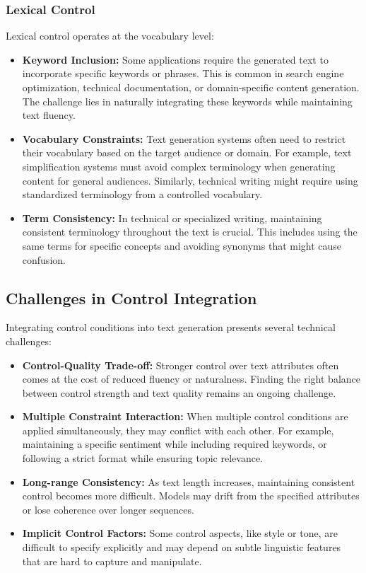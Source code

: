 \subsubsection{Lexical Control}

Lexical control operates at the vocabulary level:

\begin{itemize}
   \item \textbf{Keyword Inclusion:} Some applications require the generated text to incorporate specific keywords or phrases. This is common in search engine optimization, technical documentation, or domain-specific content generation. The challenge lies in naturally integrating these keywords while maintaining text fluency.
   
   \item \textbf{Vocabulary Constraints:} Text generation systems often need to restrict their vocabulary based on the target audience or domain. For example, text simplification systems must avoid complex terminology when generating content for general audiences. Similarly, technical writing might require using standardized terminology from a controlled vocabulary.
   
   \item \textbf{Term Consistency:} In technical or specialized writing, maintaining consistent terminology throughout the text is crucial. This includes using the same terms for specific concepts and avoiding synonyms that might cause confusion.
\end{itemize}

\subsection{Challenges in Control Integration}

Integrating control conditions into text generation presents several technical challenges:

\begin{itemize}
   \item \textbf{Control-Quality Trade-off:} Stronger control over text attributes often comes at the cost of reduced fluency or naturalness. Finding the right balance between control strength and text quality remains an ongoing challenge.
   
   \item \textbf{Multiple Constraint Interaction:} When multiple control conditions are applied simultaneously, they may conflict with each other. For example, maintaining a specific sentiment while including required keywords, or following a strict format while ensuring topic relevance.
   
   \item \textbf{Long-range Consistency:} As text length increases, maintaining consistent control becomes more difficult. Models may drift from the specified attributes or lose coherence over longer sequences.
   
   \item \textbf{Implicit Control Factors:} Some control aspects, like style or tone, are difficult to specify explicitly and may depend on subtle linguistic features that are hard to capture and manipulate.
\end{itemize}

